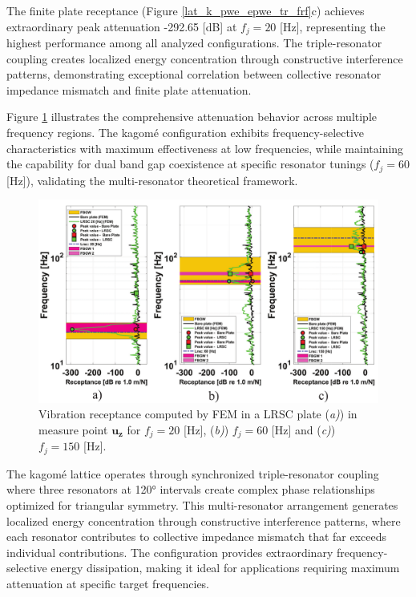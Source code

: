 \documentclass[review,numbers,sort&compress]{elsarticle}
\begin{document}
The finite plate receptance (Figure \ref{lat_k_pwe_epwe_tr_frf}c) achieves extraordinary peak attenuation -292.65 [dB] at $f_j = 20$ [Hz], representing the highest performance among all analyzed configurations. The triple-resonator coupling creates localized energy concentration through constructive interference patterns, demonstrating exceptional correlation between collective resonator impedance mismatch and finite plate attenuation.

Figure \ref{lat_k_tr_frf_f1_f2_f3} illustrates the comprehensive attenuation behavior across multiple frequency regions. The kagomé configuration exhibits frequency-selective characteristics with maximum effectiveness at low frequencies, while maintaining the capability for dual band gap coexistence at specific resonator tunings ($f_j = 60$ [Hz]), validating the multi-resonator theoretical framework.

\begin{figure}[htb]
	\centering
	\includegraphics[width=1.0\textwidth]{2_5_disp_frf_kag_3_receps.pdf}
	\caption{Vibration receptance computed by FEM in a LRSC plate (\textit{a)}) in measure point $\mathbf{u_z}$  for $f_j = 20$ [Hz], (\textit{b)}) $f_j = 60$ [Hz] and (\textit{c)}) $f_j = 150$ [Hz].}
	\label{lat_k_tr_frf_f1_f2_f3}
\end{figure}

The kagomé lattice operates through synchronized triple-resonator coupling where three resonators at 120° intervals create complex phase relationships optimized for triangular symmetry. This multi-resonator arrangement generates localized energy concentration through constructive interference patterns, where each resonator contributes to collective impedance mismatch that far exceeds individual contributions. The configuration provides extraordinary frequency-selective energy dissipation, making it ideal for applications requiring maximum attenuation at specific target frequencies.
\end{document}
